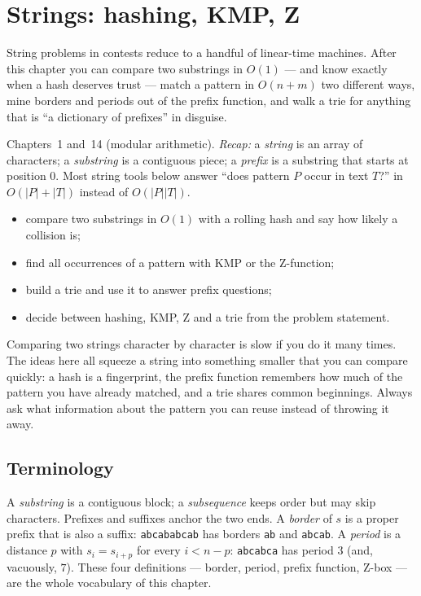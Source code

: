 \chapter{Strings: hashing, KMP, Z}\label{ch:strings}

String problems in contests reduce to a handful of linear-time
machines. After this chapter you can compare two substrings in
$O(1)$ --- and know exactly when a hash deserves trust --- match a
pattern in $O(n+m)$ two different ways, mine borders and periods
out of the prefix function, and walk a trie for anything that is
``a dictionary of prefixes'' in disguise.

\begin{rulebox}
Chapters~1 and~14 (modular arithmetic). \emph{Recap:} a \emph{string} is an array of characters; a \emph{substring} is a contiguous piece; a \emph{prefix} is a substring that starts at position 0. Most string tools below answer ``does pattern $P$ occur in text $T$?'' in $O(|P|+|T|)$ instead of $O(|P||T|)$.
\end{rulebox}
\begin{wins}
\begin{itemize}
\item compare two substrings in $O(1)$ with a rolling hash and say how likely a collision is;
\item find all occurrences of a pattern with KMP or the Z-function;
\item build a trie and use it to answer prefix questions;
\item decide between hashing, KMP, Z and a trie from the problem statement.
\end{itemize}
\end{wins}
\begin{principle}
Comparing two strings character by character is slow if you do it many times. The ideas here all squeeze a string into something smaller that you can compare quickly: a hash is a fingerprint, the prefix function remembers how much of the pattern you have already matched, and a trie shares common beginnings. Always ask what information about the pattern you can reuse instead of throwing it away.
\end{principle}

\section{Terminology}\label{sec:strterm}
A \emph{substring} is a contiguous block; a \emph{subsequence}
keeps order but may skip characters. Prefixes and suffixes anchor
the two ends. A \emph{border} of $s$ is a proper prefix that is
also a suffix: \texttt{abcababcab} has borders \texttt{ab} and
\texttt{abcab}. A \emph{period} is a distance $p$ with
$s_i = s_{i+p}$ for every $i < n-p$: \texttt{abcabca} has period
$3$ (and, vacuously, $7$). These four definitions --- border,
period, prefix function, Z-box --- are the whole vocabulary of
this chapter.

